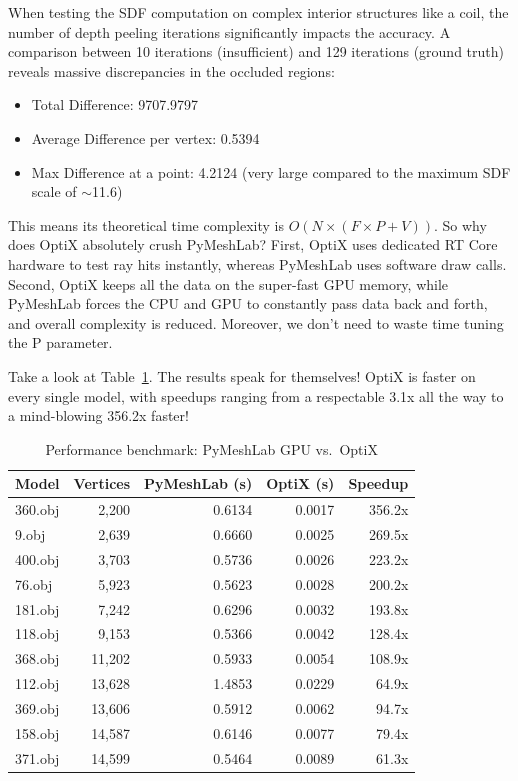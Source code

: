 When testing the SDF computation on complex interior structures like a coil, the number of depth peeling iterations significantly impacts the accuracy. A comparison between 10 iterations (insufficient) and 129 iterations (ground truth) reveals massive discrepancies in the occluded regions:

\begin{itemize}
    \item Total Difference: 9707.9797
    \item Average Difference per vertex: 0.5394
    \item Max Difference at a point: 4.2124 (very large compared to the maximum SDF scale of $\sim$11.6)
\end{itemize}

This means its theoretical time complexity is $O(N \times (F \times P + V))$. So why does OptiX absolutely crush PyMeshLab? First, OptiX uses dedicated RT Core hardware to test ray hits instantly, whereas PyMeshLab uses software draw calls. Second, OptiX keeps all the data on the super-fast GPU memory, while PyMeshLab forces the CPU and GPU to constantly pass data back and forth, and overall complexity is reduced. Moreover, we don't need to waste time tuning the P parameter.

Take a look at Table~\ref{tab:benchmark}. The results speak for themselves! OptiX is faster on every single model, with speedups ranging from a respectable 3.1x all the way to a mind-blowing 356.2x faster!

\begin{table}[ht]
\centering
\begin{tabular}{@{}lrrrr@{}}
\toprule
\textbf{Model} & \textbf{Vertices} & \textbf{PyMeshLab (s)} & \textbf{OptiX (s)} & \textbf{Speedup} \\
\midrule
360.obj & 2,200 & 0.6134 & 0.0017 & 356.2x \\
9.obj & 2,639 & 0.6660 & 0.0025 & 269.5x \\
400.obj & 3,703 & 0.5736 & 0.0026 & 223.2x \\
76.obj & 5,923 & 0.5623 & 0.0028 & 200.2x \\
181.obj & 7,242 & 0.6296 & 0.0032 & 193.8x \\
118.obj & 9,153 & 0.5366 & 0.0042 & 128.4x \\
368.obj & 11,202 & 0.5933 & 0.0054 & 108.9x \\
112.obj & 13,628 & 1.4853 & 0.0229 & 64.9x \\
369.obj & 13,606 & 0.5912 & 0.0062 & 94.7x \\
158.obj & 14,587 & 0.6146 & 0.0077 & 79.4x \\
371.obj & 14,599 & 0.5464 & 0.0089 & 61.3x \\
\bottomrule
\end{tabular}
\caption{Performance benchmark: PyMeshLab GPU vs.\ OptiX}
\label{tab:benchmark}
\end{table}

